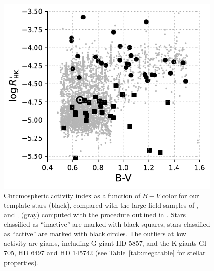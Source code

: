 \begin{figure}
\centering
\includegraphics[scale=0.8]{freckles/rhk_sample.pdf}
\caption{Chromospheric activity \logrprime index as a function of $B-V$ color for our template stars (black), compared with the large field samples of \citet{Duncan1991}, \citet{Wright2004} and \citet{Isaacson2010}, (gray) computed with the procedure outlined in \citet{Mittag2013}. Stars classified as ``inactive'' are marked with black squares, stars classified as ``active'' are marked with black circles. The outliers at low activity are giants, including G giant HD 5857, and the K giants Gl 705, HD 6497 and HD 145742 (see Table~\ref{tab:megatable} for stellar properties).}
\label{fig:rhk}
\end{figure}

